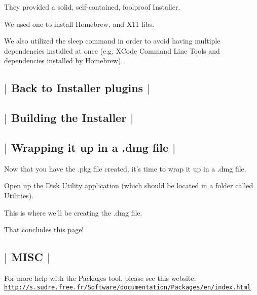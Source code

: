 They provided a solid, self-\/contained, foolproof Installer.

We used one to install {\ttfamily Homebrew}, and {\ttfamily X11} libs.

We also utilized the {\ttfamily sleep} command in order to avoid having multiple dependencies installed at once (e.\-g. {\ttfamily X\-Code Command Line Tools} and dependencies installed by {\ttfamily Homebrew}). 

 \subsection*{$\vert$ Back to Installer plugins $\vert$ }



 \subsection*{$\vert$ Building the Installer $\vert$ }



 \subsection*{$\vert$ Wrapping it up in a .dmg file $\vert$ }

Now that you have the {\ttfamily .pkg} file created, it's time to wrap it up in a {\ttfamily .dmg} file.

Open up the {\ttfamily Disk Utility} application (which should be located in a folder called {\ttfamily Utilities}).

This is where we'll be creating the .dmg file.

That concludes this page!



 \subsection*{$\vert$ M\-I\-S\-C $\vert$ }

For more help with the Packages tool, please see this website\-: \href{http://s.sudre.free.fr/Software/documentation/Packages/en/index.html}{\tt http\-://s.\-sudre.\-free.\-fr/\-Software/documentation/\-Packages/en/index.\-html} 